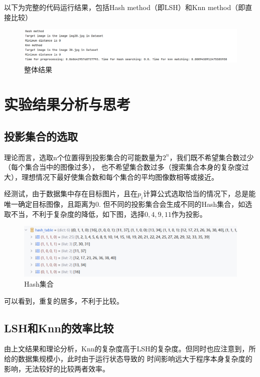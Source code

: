 \documentclass{article}
\begin{document}
    以下为完整的代码运行结果，包括Hash method（即LSH）和Knn method（即直接比较）

\begin{figure}[h]
\centering
\includegraphics[width=1\textwidth]{./timeHash}
\caption{整体结果}
\end{figure}

\section{实验结果分析与思考}
\subsection{投影集合的选取}

    理论而言，选取n个位置得到投影集合的可能数量为\(2^n\)，我们既不希望集合数过少（每个集合当中的图像过多），
    也不希望集合数过多（搜索集合本身的复杂度过大），理想情况下最好使集合数和每个集合的平均图像数相等或接近。

    经测试，由于数据集中存在目标图片，且在\(p_i\)计算公式选取恰当的情况下，总是能唯一确定目标图像，且距离为0.
    但不同的投影集合会生成不同的Hash集合，如选取不当，不利于复杂度的降低，如下图，选择\(0, 4, 9, 11\)作为投影。

\begin{figure}[h]
\centering
\includegraphics[width=1\textwidth]{./hashtable}
\caption{Hash集合}
\end{figure}

    可以看到，重复的居多，不利于比较。

\subsection{LSH和Knn的效率比较}

    由上文结果和理论分析，Knn的复杂度高于LSH的复杂度。但同时也应注意到，所给的数据集规模小，此时由于运行状态导致的
    时间影响远大于程序本身复杂度的影响，无法较好的比较两者效率。
\end{document}
